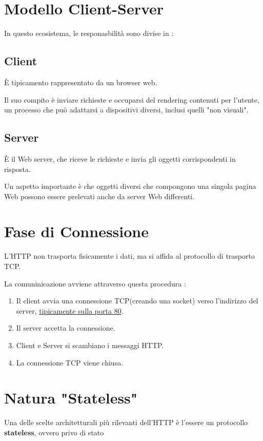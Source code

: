 \section{Modello Client-Server}
In questo ecosistema, le responasbilità sono divise in :

\subsection{Client}
È tipicamento rappresentato da un browser web.

Il suo compito è inviare richieste e occuparsi del rendering contenuti per l'utente, un processo che può adattarsi a dispositivi diversi, inclusi quelli "non visuali".

\subsection{Server}
È il Web server, che riceve le richieste e invia gli oggetti corrispondenti in risposta. 

Un aspetto importante è che oggetti diversi che compongono una singola pagina Web possono essere prelevati anche da server Web differenti.

\section{Fase di Connessione}
L'HTTP non trasporta fisicamente i dati, ma si affida al protocollo di trasporto TCP.

La comuninicazione avviene attraverso questa procedura :

\begin{enumerate}
    \item Il client avvia una connessione TCP(creando una socket) verso l'indirizzo del server, \uline{tipicamente sulla porta 80}.
    \item Il server accetta la connessione.
    \item Client e Server si scambiano i messaggi HTTP.
    \item La connessione TCP viene chiusa.
\end{enumerate}

\section{Natura "Stateless"}
Una delle scelte architetturali più rilevanti dell'HTTP è l'essere un protocollo \textbf{stateless}, ovvero privo di stato

